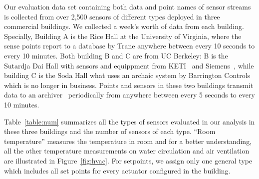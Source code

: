 Our evaluation data set containing both data and point names of sensor streams is collected from over 2,500 sensors of different types deployed in three commercial buildings. 
We collected a week's worth of data from each building.
Specially, Building A is the Rice Hall at the University of Virginia, where the sense points report to a database by Trane anywhere between every 10 seconds to every 10 minutes.
Both building B and C are from UC Berkeley: B is the Sutardja Dai Hall with sensors and equippment from KETI~\cite{keti} and Siemens~\cite{bacnet}, while building C is the Soda Hall what uses an archaic system by Barrington Controls which is no longer in business. 
Points and sensors in these two buildings transmit data to an archiver~\cite{smap} periodically from anywhere between every 5 seconds to every 10 minutes.

Table~\ref{table:num} summarizes all the types of sensors evaluated in our analysis in these three buildings and the number of sensors of each type. ``Room temperature'' measures the temperature in room and for a better understanding, all the other temperature measurements on water circulation and air ventilation are illustrated in Figure~\ref{fig:hvac}. For setpoints, we assign only
one general type which includes all set points for every actuator configured in the building.

